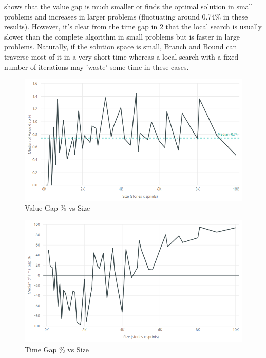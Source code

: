  shows that the value gap is much smaller or finds the optimal solution in small problems and increases in larger problems (fluctuating around 0.74\% in these results). However, it's clear from the time gap in \cref{fig:time_gap_vs_size} that the local search is usually slower than the complete algorithm in small problems but is faster in large problems. Naturally, if the solution space is small, Branch and Bound can traverse most of it in a very short time whereas a local search with a fixed number of iterations may 'waste' some time in these cases.

\begin{figure}[h!]
    \centering
    \includegraphics[width=\textwidth]{Figures/Results/annealing_value_gap_size.png}
    \caption{Value Gap \% vs Size}
    \label{fig:value_gap_vs_size}
\end{figure}

\begin{figure}[h!]
    \centering
    \includegraphics[width=\textwidth]{Figures/Results/annealing_time_gap_size.png}
    \caption{Time Gap \% vs Size}
    \label{fig:time_gap_vs_size}
\end{figure}

